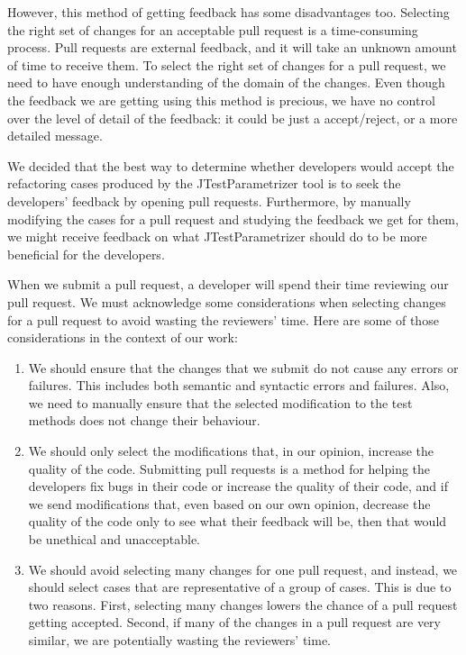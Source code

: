 However, this method of getting feedback has some disadvantages too. Selecting the right set of changes for an acceptable pull request is a time-consuming process. Pull requests are external feedback, and it will take an unknown amount of time to receive them. To select the right set of changes for a pull request, we need to have enough understanding of the domain of the changes. Even though the feedback we are getting using this method is precious, we have no control over the level of detail of the feedback: it could be just a accept/reject, or a more detailed message.

We decided that the best way to determine whether developers would accept the refactoring cases produced by the JTestParametrizer tool is to seek the developers' feedback by opening pull requests. Furthermore, by manually modifying the cases for a pull request and studying the feedback we get for them, we might receive feedback on what JTestParametrizer should do to be more beneficial for the developers.

When we submit a pull request, a developer will spend their time reviewing our pull request. We must acknowledge some considerations when selecting changes for a pull request to avoid wasting the reviewers' time. Here are some of those considerations in the context of our work:

\begin{enumerate}

  \item We should ensure that the changes that we submit do not cause any errors or failures. This includes both semantic and syntactic errors and failures. Also, we need to manually ensure that the selected modification to the test methods does not change their behaviour.

  \item \label{item:min-quality} We should only select the modifications that, in our opinion, increase the quality of the code. Submitting pull requests is a method for helping the developers fix bugs in their code or increase the quality of their code, and if we send modifications that, even based on our own opinion, decrease the quality of the code only to see what their feedback will be, then that would be unethical and unacceptable.

  \item \label{item:representative} We should avoid selecting many changes for one pull request, and instead, we should select cases that are representative of a group of cases. This is due to two reasons. First, selecting many changes lowers the chance of a pull request getting accepted. Second, if many of the changes in a pull request are very similar, we are potentially wasting the reviewers' time.
  
\end{enumerate}

